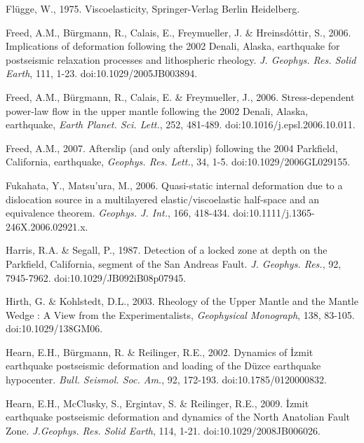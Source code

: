 \documentclass[extra,mreferee]{gji}
\begin{document}
\begin{thebibliography}{}
 Fl\"ugge,
  W., 1975. Viscoelasticity, Springer-Verlag Berlin Heidelberg.

 Freed, A.M., B\"urgmann,
  R., Calais, E., Freymueller, J. \& Hreinsd\'ottir, S.,
  2006. Implications of deformation following the 2002 Denali, Alaska,
  earthquake for postseismic relaxation processes and lithospheric
  rheology. \textit{J. Geophys. Res. Solid Earth}, 111,
  1-23. doi:10.1029/2005JB003894.

 Freed, A.M.,
  B\"urgmann, R., Calais, E. \& Freymueller, J.,
  2006. Stress-dependent power-law flow in the upper mantle following
  the 2002 Denali, Alaska, earthquake, \textit{Earth
    Planet. Sci. Lett.}, 252, 481-489. doi:10.1016/j.epsl.2006.10.011.

 Freed, A.M., 2007. Afterslip
  (and only afterslip) following the 2004 Parkfield, California,
  earthquake, \textit{Geophys. Res. Lett.}, 34,
  1-5. doi:10.1029/2006GL029155.

 Fukahata, Y.,
  Matsu’ura, M., 2006. Quasi-static internal deformation due to a
  dislocation source in a multilayered elastic/viscoelastic half-space
  and an equivalence theorem. \textit{Geophys. J. Int.}, 166,
  418-434. doi:10.1111/j.1365-246X.2006.02921.x.

 Harris, R.A. \&
  Segall, P., 1987. Detection of a locked zone at depth on the
  Parkfield, California, segment of the San Andreas
  Fault. \textit{J. Geophys. Res.}, 92,
  7945-7962. doi:10.1029/JB092iB08p07945.

 Hirth, G. \& Kohlstedt,
  D.L., 2003. Rheology of the Upper Mantle and the Mantle Wedge : A
  View from the Experimentalists, \textit{Geophysical Monograph}, 138,
  83-105. doi:10.1029/138GM06.

 Hearn, E.H., B\"urgmann, R. \&
  Reilinger, R.E., 2002. Dynamics of \.Izmit earthquake postseismic
  deformation and loading of the D\"uzce earthquake
  hypocenter. \textit{Bull.  Seismol. Soc. Am.}, 92,
  172-193. doi:10.1785/0120000832.

 Hearn, E.H., McClusky, S.,
  Ergintav, S. \& Reilinger, R.E., 2009. \.Izmit earthquake
  postseismic deformation and dynamics of the North Anatolian Fault
  Zone. \textit{J.Geophys. Res. Solid Earth}, 114,
  1-21. doi:10.1029/2008JB006026.


\end{thebibliography}
\end{document}
